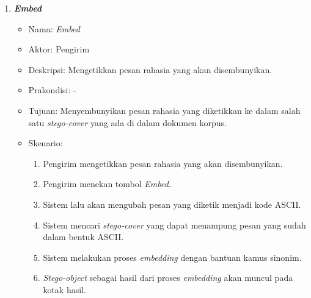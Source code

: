 \begin{enumerate}
	\item \textbf{\textit{Embed}}
	\begin{itemize}
		\item Nama: \textit{Embed}
		\item Aktor: Pengirim
		\item Deskripsi: Mengetikkan pesan rahasia yang akan disembunyikan.
		\item Prakondisi: -
		\item Tujuan: Menyembunyikan pesan rahasia yang diketikkan ke dalam salah satu \textit{stego-cover} yang ada di dalam dokumen korpus.
		\item Skenario:
			\begin{enumerate}
				\item Pengirim mengetikkan pesan rahasia yang akan disembunyikan.
				\item Pengirim menekan tombol \textit{Embed}.
				\item Sistem lalu akan mengubah pesan yang diketik menjadi kode ASCII.
				\item Sistem mencari \textit{stego-cover} yang dapat menampung pesan yang sudah dalam bentuk ASCII.
				\item Sistem melakukan proses \textit{embedding} dengan bantuan kamus sinonim.
				\item \textit{Stego-object} sebagai hasil dari proses \textit{embedding} akan muncul pada kotak hasil.
			\end{enumerate}
	\end{itemize}
	

\end{enumerate}
